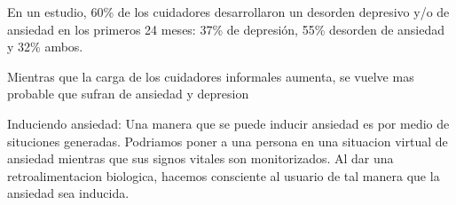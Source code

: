 \documentclass{report}
\begin{document}
	

En un estudio, 60\% de los cuidadores desarrollaron un desorden depresivo y/o de ansiedad en los primeros 24 meses: 37\% de depresi\'on, 55\% desorden de ansiedad y 32\% ambos. \citep{Joling2014}


Mientras que la carga de los cuidadores informales aumenta, se vuelve mas probable que sufran de ansiedad y depresion \citep{Denno20131731}

Induciendo ansiedad: Una manera que se puede inducir ansiedad es por medio de situciones generadas. Podriamos poner a una persona en una situacion virtual de ansiedad mientras que sus signos
vitales son monitorizados. Al dar una retroalimentacion biologica, hacemos consciente al usuario de tal manera que la ansiedad sea inducida.
        {\normalsize
		
                
        }
\end{document}
